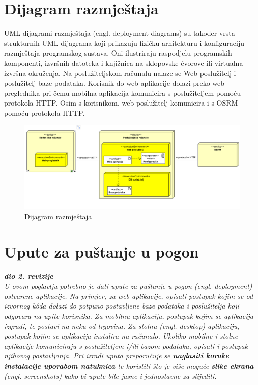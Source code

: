 \eject 


\section{Dijagram razmještaja}


UML-dijagrami razmještaja (engl. deployment diagrams) su takoder vrsta strukturnih UML-dijagrama koji prikazuju fizičku arhitekturu i konfiguraciju razmještaja programskog sustava. Oni ilustriraju raspodjelu programskih komponenti, izvršnih datoteka i knjižnica na sklopovske čvorove ili virtualna izvršna okruženja.
Na poslužiteljskom računalu nalaze se Web poslužitelj i poslužitelj baze podataka. Korisnik do web aplikacije dolazi preko web preglednika pri čemu mobilna aplikacija komunicira s poslužiteljem pomoću protokola HTTP. Osim s korisnikom, web poslužitelj komunicira i s OSRM pomoću protokola HTTP.

\vspace{5cm}

\begin{figure}[H]
	\includegraphics[width=\textwidth]{slike/dijagram_razmjestaja.png} %
	\centering
	\caption{Dijagram razmještaja}
	\label{fig:dijagramaktivnosti}
\end{figure}
\eject 

\section{Upute za puštanje u pogon}

\textbf{\textit{dio 2. revizije}}\\

\textit{U ovom poglavlju potrebno je dati upute za puštanje u pogon (engl. deployment) ostvarene aplikacije. Na primjer, za web aplikacije, opisati postupak kojim se od izvornog kôda dolazi do potpuno postavljene baze podataka i poslužitelja koji odgovara na upite korisnika. Za mobilnu aplikaciju, postupak kojim se aplikacija izgradi, te postavi na neku od trgovina. Za stolnu (engl. desktop) aplikaciju, postupak kojim se aplikacija instalira na računalo. Ukoliko mobilne i stolne aplikacije komuniciraju s poslužiteljem i/ili bazom podataka, opisati i postupak njihovog postavljanja. Pri izradi uputa preporučuje se \textbf{naglasiti korake instalacije uporabom natuknica} te koristiti što je više moguće \textbf{slike ekrana} (engl. screenshots) kako bi upute bile jasne i jednostavne za slijediti.}


